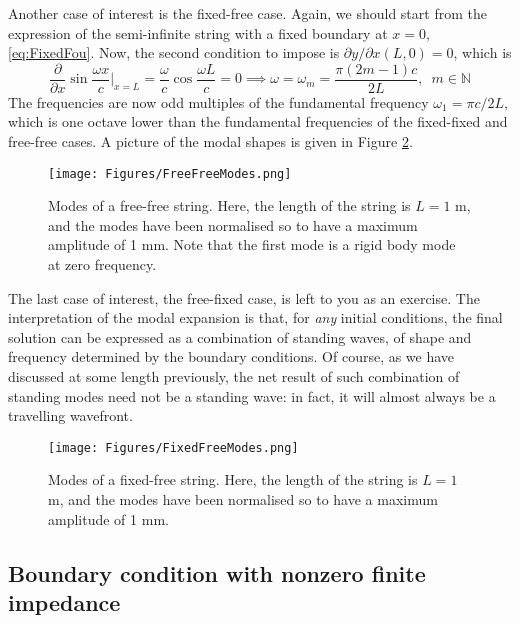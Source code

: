 \medskip \medskip 

\noindent
Another case of interest is the fixed-free case. Again, we should start from the expression of the semi-infinite string with a fixed boundary at $x=0$, \eqref{eq:FixedFou}. Now, the second condition to impose is $\partial y / \partial x (L,0) = 0$, which is
\begin{equation}
\frac{\partial}{\partial x}\sin\frac{\omega x}{c}\Bigg|_{x=L} =  \frac{\omega}{c} \cos \frac{\omega L}{c} = 0 \implies \omega = \omega_m = \frac{\pi (2m-1) c}{2L}, \,\,\, m \in \mathbb{N}
\end{equation}
The frequencies are now odd multiples of the fundamental frequency $\omega_1 = \pi c / 2 L$, which is one octave lower than the fundamental frequencies of the fixed-fixed and free-free cases. A picture of the modal shapes is given in Figure \ref{fig:fixfree}.


\begin{figure}[hbt]
\texttt{[image: Figures/FreeFreeModes.png]}
\caption{Modes of a free-free string. Here, the length of the string is $L =1$ m, and the modes have been normalised so to have a maximum amplitude of 1 mm. Note that the first mode is a rigid body mode at zero frequency.}\label{fig:freefree}
\end{figure}

\medskip \medskip 

\noindent
The last case of interest, the free-fixed case, is left to you as an exercise. The interpretation of the modal expansion is that, for \emph{any} initial conditions, the final solution can be expressed as a combination of standing waves, of shape and frequency determined by the boundary conditions. Of course, as we have discussed at some length previously, the net result of such combination of standing modes need not be a standing wave: in fact, it will almost always be a travelling wavefront. 


\begin{figure}[hbt]
\texttt{[image: Figures/FixedFreeModes.png]}
\caption{Modes of a fixed-free string. Here, the length of the string is $L =1$ m, and the modes have been normalised so to have a maximum amplitude of 1 mm.}\label{fig:fixfree}
\end{figure}



\subsection{Boundary condition with nonzero finite impedance}

